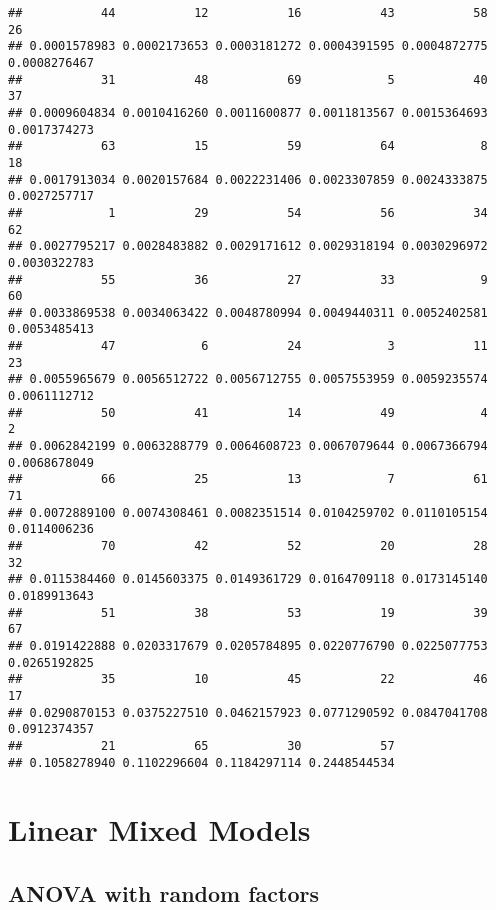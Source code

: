 \documentclass[
]{book}
\begin{document}
\begin{verbatim}
##           44           12           16           43           58           26 
## 0.0001578983 0.0002173653 0.0003181272 0.0004391595 0.0004872775 0.0008276467 
##           31           48           69            5           40           37 
## 0.0009604834 0.0010416260 0.0011600877 0.0011813567 0.0015364693 0.0017374273 
##           63           15           59           64            8           18 
## 0.0017913034 0.0020157684 0.0022231406 0.0023307859 0.0024333875 0.0027257717 
##            1           29           54           56           34           62 
## 0.0027795217 0.0028483882 0.0029171612 0.0029318194 0.0030296972 0.0030322783 
##           55           36           27           33            9           60 
## 0.0033869538 0.0034063422 0.0048780994 0.0049440311 0.0052402581 0.0053485413 
##           47            6           24            3           11           23 
## 0.0055965679 0.0056512722 0.0056712755 0.0057553959 0.0059235574 0.0061112712 
##           50           41           14           49            4            2 
## 0.0062842199 0.0063288779 0.0064608723 0.0067079644 0.0067366794 0.0068678049 
##           66           25           13            7           61           71 
## 0.0072889100 0.0074308461 0.0082351514 0.0104259702 0.0110105154 0.0114006236 
##           70           42           52           20           28           32 
## 0.0115384460 0.0145603375 0.0149361729 0.0164709118 0.0173145140 0.0189913643 
##           51           38           53           19           39           67 
## 0.0191422888 0.0203317679 0.0205784895 0.0220776790 0.0225077753 0.0265192825 
##           35           10           45           22           46           17 
## 0.0290870153 0.0375227510 0.0462157923 0.0771290592 0.0847041708 0.0912374357 
##           21           65           30           57 
## 0.1058278940 0.1102296604 0.1184297114 0.2448544534
\end{verbatim}

\hypertarget{linear-mixed-models}{%
\chapter{Linear Mixed Models}\label{linear-mixed-models}}

\hypertarget{anova-with-random-factors}{%
\section{ANOVA with random factors}\label{anova-with-random-factors}}
\end{document}
